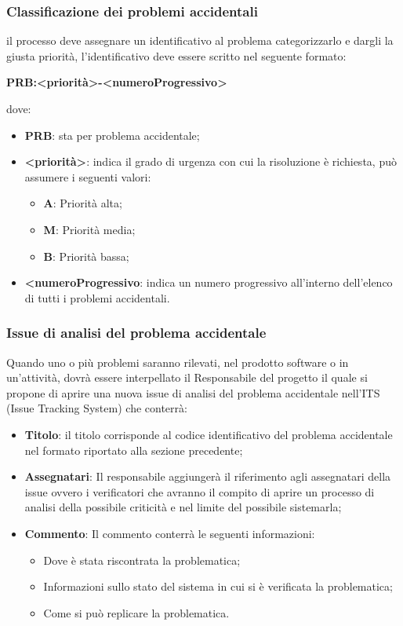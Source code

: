 		\subsubsection{Classificazione dei problemi accidentali}
			il processo deve assegnare un identificativo al problema categorizzarlo e dargli la giusta priorità, l’identificativo deve essere scritto nel seguente formato:
			\begin{center}
				\textbf{PRB:<priorità>-<numeroProgressivo>}
			\end{center}
			dove:
			\begin{itemize}
				\item\textbf{PRB}: sta per problema accidentale;
				\item\textbf{<priorità>}: indica il grado di urgenza con cui la risoluzione è richiesta, può assumere i seguenti valori:
					\begin{itemize}
						\item\textbf{A}: Priorità alta;
						\item\textbf{M}: Priorità media;
						\item\textbf{B}: Priorità bassa;
					\end{itemize}
				\item\textbf{<numeroProgressivo}: indica un numero progressivo all’interno dell’elenco di tutti i problemi accidentali.
			\end{itemize}
		\subsubsection{Issue di analisi del problema accidentale}
			Quando uno o più problemi saranno rilevati, nel prodotto software o in un'attività, dovrà essere interpellato il Responsabile del progetto il quale si propone di aprire una nuova issue di analisi del problema accidentale nell'ITS (Issue Tracking System) che conterrà:
			\begin{itemize}
				\item\textbf{Titolo}: il titolo corrisponde al codice identificativo del problema accidentale nel formato riportato alla sezione precedente;
				\item\textbf{Assegnatari}: Il responsabile aggiungerà il riferimento agli assegnatari della issue ovvero i verificatori che avranno il compito di aprire un processo di analisi della possibile criticità e nel limite del possibile sistemarla;
				\item\textbf{Commento}: Il commento conterrà le seguenti informazioni:
					\begin{itemize}
						\item Dove è stata riscontrata la problematica;
						\item Informazioni sullo stato del sistema in cui si è verificata la problematica;
						\item Come si può replicare la problematica.
					\end{itemize}				
			\end{itemize}	
